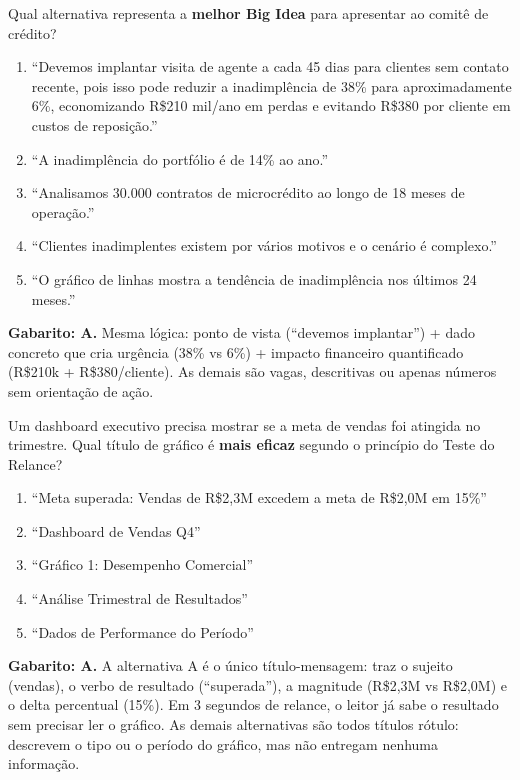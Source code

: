 \begin{SolvedBox}[title=Questão 8 (Prova II Chamada) --- Big Idea (1{,}0 pt)]
Qual alternativa representa a \textbf{melhor Big Idea} para apresentar ao comitê de crédito?
\begin{enumerate}[label=\Alph*)]
  \item ``Devemos implantar visita de agente a cada 45 dias para clientes sem contato recente, pois isso pode reduzir a inadimplência de 38\% para aproximadamente 6\%, economizando R\$210 mil/ano em perdas e evitando R\$380 por cliente em custos de reposição.''
  \item ``A inadimplência do portfólio é de 14\% ao ano.''
  \item ``Analisamos 30.000 contratos de microcrédito ao longo de 18 meses de operação.''
  \item ``Clientes inadimplentes existem por vários motivos e o cenário é complexo.''
  \item ``O gráfico de linhas mostra a tendência de inadimplência nos últimos 24 meses.''
\end{enumerate}
\end{SolvedBox}

\textbf{Gabarito: A.} Mesma lógica: ponto de vista (``devemos implantar'') + dado concreto que cria urgência (38\% vs 6\%) + impacto financeiro quantificado (R\$210k + R\$380/cliente). As demais são vagas, descritivas ou apenas números sem orientação de ação.

\begin{SolvedBox}[title=Questão 9 (Prova II Chamada) --- Título-Mensagem e Teste do Relance (1{,}0 pt)]
Um dashboard executivo precisa mostrar se a meta de vendas foi atingida no trimestre. Qual título de gráfico é \textbf{mais eficaz} segundo o princípio do Teste do Relance?
\begin{enumerate}[label=\Alph*)]
  \item ``Meta superada: Vendas de R\$2,3M excedem a meta de R\$2,0M em 15\%''
  \item ``Dashboard de Vendas Q4''
  \item ``Gráfico 1: Desempenho Comercial''
  \item ``Análise Trimestral de Resultados''
  \item ``Dados de Performance do Período''
\end{enumerate}
\end{SolvedBox}

\textbf{Gabarito: A.} A alternativa A é o único título-mensagem: traz o sujeito (vendas), o verbo de resultado (``superada''), a magnitude (R\$2,3M vs R\$2,0M) e o delta percentual (15\%). Em 3 segundos de relance, o leitor já sabe o resultado sem precisar ler o gráfico. As demais alternativas são todos títulos rótulo: descrevem o tipo ou o período do gráfico, mas não entregam nenhuma informação.

